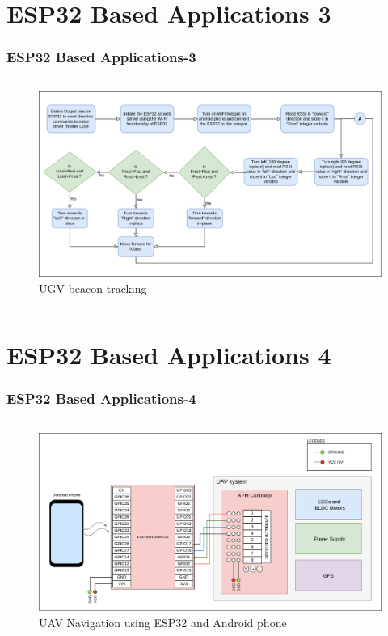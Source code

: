 \documentclass{beamer}
\begin{document}
\section{ESP32 Based Applications 3}
\begin{frame}
\frametitle{ESP32 Based Applications-3}
\begin{columns}
	\begin{figure}[h!]
  		\centering
  		\includegraphics[width=\linewidth]{./figs/Flow_UGV_beacon.png}
  		\caption{UGV beacon tracking}
  		\label{Flow_UGV_beacon}
	\end{figure}
\end{columns}
\end{frame}

\section{ESP32 Based Applications 4}
\begin{frame}
\frametitle{ESP32 Based Applications-4}
\begin{columns}
	\begin{figure}[h!]
  		\centering
  		\includegraphics[width=\linewidth]{./figs/Wiring_UAV_ESP32_commlink.png}
  		\caption{UAV Navigation using ESP32 and Android phone}
  		\label{Wiring_UAV_ESP32_commlink}
	\end{figure}
\end{columns}
\end{frame}
\end{document}
